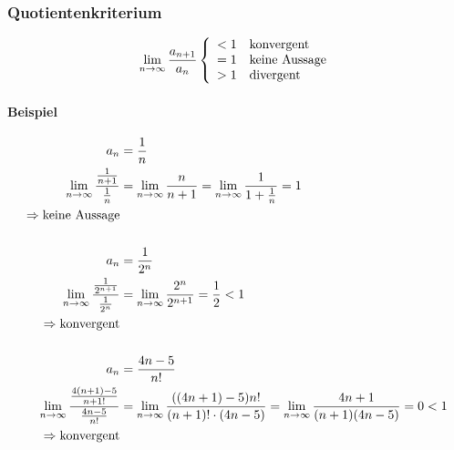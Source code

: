 \subsubsection{Quotientenkriterium}

\begin{gesetz}
	\[
		\lim_{n \rightarrow{} \infty} \frac{a_{n + 1}}{a_n}
		\left \{
		\begin{array}{l}
			< 1 \quad \text{konvergent}    \\
			= 1 \quad \text{keine Aussage} \\
			> 1 \quad \text{divergent}
		\end{array}
		\right.
	\]
\end{gesetz}

\paragraph{Beispiel}

\begin{align*}
	a_n                                                           & = \frac{1}{n}                                                                                                \\
	\lim_{n \rightarrow{} \infty} \frac{\frac{1}{n + 1}}{\frac{1}{n}}            & = \lim_{n \rightarrow{} \infty} \frac{n}{n+1} = \lim_{n \rightarrow{} \infty} \frac{1}{1 + \frac{1}{n}} = 1                                \\
	\Rightarrow \text{keine Aussage}                                                                                                                                             \\
	\\
	a_n                                                           & = \frac{1}{2^n}                                                                                              \\
	\lim_{n \rightarrow{} \infty} \frac{\frac{1}{2^{n+1}}}{\frac{1}{2^n}}        & = \lim_{n \rightarrow{} \infty} \frac{2^n}{2^{n+1}} = \frac{1}{2} < 1                                                       \\
	\Rightarrow \text{konvergent}                                                                                                                                                \\
	\\
	a_n                                                           & = \frac{4n-5}{n!}                                                                                            \\
	\lim_{n \rightarrow{} \infty} \frac{\frac{4(n+1) -5}{n+1!}}{\frac{4n-5}{n!}} & = \lim_{n \rightarrow{} \infty} \frac{((4n+1) -5) n!}{(n+1)!\cdot (4n-5)} = \lim_{n \rightarrow{} \infty} \frac{4n+1}{(n+1)(4n-5)} = 0 < 1 \\
	\Rightarrow \text{konvergent}
\end{align*}

